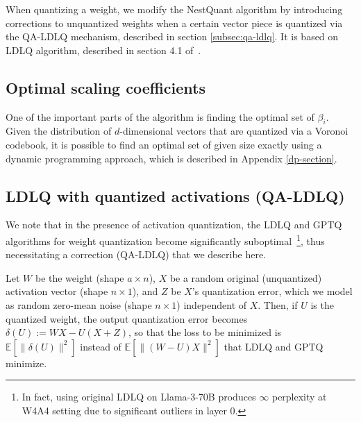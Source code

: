 \documentclass{article}
\def\EE{\mathbb{E}}
\DeclareMathOperator*{\argmin}{\arg\!\min}
\theoremstyle{plain}
\newtheorem{lemma}[theorem]{Lemma}
\theoremstyle{definition}
\theoremstyle{remark}
\begin{document}
When quantizing a weight, we modify the NestQuant algorithm by introducing corrections to unquantized weights when a certain vector piece is quantized via the QA-LDLQ mechanism, described in section \ref{subsec:qa-ldlq}. It is based on LDLQ algorithm, described in section 4.1 of~\cite{tseng2024}.

\subsection{Optimal scaling coefficients}

One of the important parts of the algorithm is finding the optimal set of $\beta_i$. Given the distribution of $d$-dimensional vectors that are quantized via a Voronoi codebook, it is possible to find an optimal set of given size exactly using a dynamic programming approach, which is described in Appendix \ref{dp-section}.

\subsection{LDLQ with quantized activations (QA-LDLQ)}\label{sec:qa-ldlq}
\label{subsec:qa-ldlq}

We note that in the presence of activation quantization, the LDLQ and GPTQ algorithms for weight quantization become significantly suboptimal~\footnote{In fact, using original LDLQ on Llama-3-70B produces $\infty$ perplexity at W4A4 setting due to significant outliers in layer 0.}, thus necessitating a correction (QA-LDLQ) that we describe here.

Let $W$ be the weight (shape $a \times n$), $X$ be a random original (unquantized) activation vector (shape $n \times 1$), and $Z$ be $X$'s quantization error, which we model as random zero-mean noise (shape $n \times 1$) independent of $X$. Then, if $U$ is the quantized weight, the output quantization error becomes $\delta(U) := WX - U(X+Z)$, so that the loss to be minimized is $\EE[\|\delta(U)\|^2]$ instead of $\EE[\|(W-U)X\|^2]$ that LDLQ and GPTQ minimize.


\end{document}
